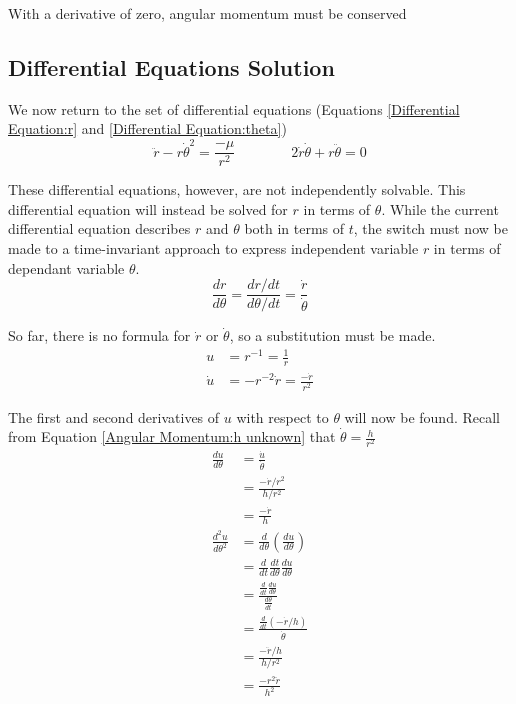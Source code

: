 \documentclass{article}
\begin{document}
With a derivative of zero, angular momentum must be conserved

\bigskip\bigskip
\subsection{Differential Equations Solution}

We now return to the set of differential equations (Equations \eqref{Differential Equation:r} and \eqref{Differential Equation:theta})
$$\ddot{r}-r\dot{\theta}^2=\frac{-\mu}{r^2} \qquad\qquad 2\dot{r}\dot{\theta}+r\ddot{\theta}=0$$

These differential equations, however, are not independently solvable. This differential equation will instead be solved for $r$ in terms of $\theta$. While the current differential equation describes $r$ and $\theta$ both in terms of $t$, the switch must now be made to a time-invariant approach to express independent variable $r$ in terms of dependant variable $\theta$.
$$\frac{dr}{d\theta{}}=\frac{dr/dt}{d\theta{}/dt}=\frac{\dot{r}}{\dot{\theta}}$$

So far, there is no formula for $\dot{r}$ or $\dot{\theta}$, so a substitution must be made.
\begin{align*}
    u       & =r^{-1}=\frac{1}{r}                  \\
    \dot{u} & =-r^{-2}\dot{r}=\frac{-\dot{r}}{r^2}
\end{align*}

The first and second derivatives of $u$ with respect to $\theta$ will now be found. Recall from Equation \eqref{Angular Momentum:h unknown} that $\dot{\theta}=\frac{h}{r^2}$
\begin{align*}
    \frac{du}{d\theta}     & =\frac{\dot{u}}{\dot{\theta}}                              \\
                           & =\frac{-\dot{r}/r^2}{h/r^2}                                \\
                           & =\frac{-\dot{r}}{h}                                        \\
    \frac{d^2u}{d\theta^2} & =\frac{d}{d\theta}(\frac{du}{d\theta})                     \\
                           & =\frac{d}{dt}\frac{dt}{d\theta}\frac{du}{d\theta}          \\
                           & =\frac{\frac{d}{dt}\frac{du}{d\theta}}{\frac{d\theta}{dt}} \\
                           & =\frac{\frac{d}{dt}(-\dot{r}/h)}{\dot{\theta}}             \\
                           & =\frac{-\ddot{r}/h}{h/r^2}                                 \\
                           & =\frac{-r^2\ddot{r}}{h^2}
\end{align*}
\end{document}
